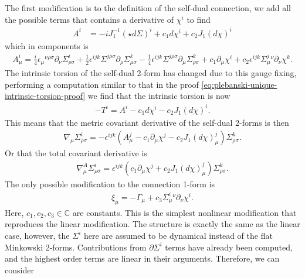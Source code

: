 \documentclass[10pt]{report}
\theoremstyle{definition}
\newcommand{\C}[0]{\mathbb{C}}
\begin{document}
        The first modification is to the definition of the self-dual connection, we add all the possible terms that contains a derivative of $\chi^i$ to find
        \begin{align}
            A^i &= -i J_1^{-1}(\star d \Sigma)^i + c_1 d\chi^i + c_2 J_1(d\chi)^i \label{eq:nonlinear-self-dual-connection-modified-definition}
        \end{align}
        which in components is 
        \begin{align}
            A^i_\mu = \frac{i}{4} \epsilon_\mu{}^{\nu\rho\sigma} \partial_\nu \Sigma^i_{\rho\sigma} + \frac{1}{2} \epsilon^{ijk} \Sigma^{j\rho\sigma} \partial_\rho \Sigma^k_{\mu\sigma} - \frac{1}{4} \epsilon^{ijk} \Sigma^{j\rho\sigma} \partial_\mu \Sigma^k_{\rho\sigma} + c_1 \partial_\mu \chi^i + c_2 \epsilon^{ijk} \Sigma^j_\mu{}^\nu \partial_\nu \chi^k.
        \end{align}
        The intrinsic torsion of the self-dual 2-form has changed due to this gauge fixing, performing a computation similar to that in the proof \cref{eq:plebanski-unique-intrinsic-torsion-proof} we find that the intrinsic torsion is now 
        \begin{align}
            -T^i = A^i - c_1 d\chi^i - c_2 J_1(d\chi)^i.
        \end{align}
        This means that the metric covariant derivative of the self-dual 2-forms is then 
        \begin{align}
            \nabla_\mu \Sigma^i_{\rho\sigma} = -\epsilon^{ijk} \left( A^j_\mu - c_1 \partial_\mu \chi^j - c_2 J_1(d\chi)^j_\mu \right) \Sigma^k_{\rho\sigma}.
        \end{align}
        Or that the total covariant derivative is 
        \begin{align}
            \nabla_\mu^A \Sigma^i_{\rho\sigma} = \epsilon^{ijk}(c_1 \partial_\mu \chi^j + c_2 J_1(d\chi)^j_\mu) \Sigma^k_{\rho\sigma} \label{eq:nonlinear-plebanski-modified-total-covariant-deriative-on-Sigma}.
        \end{align}
        The only possible modification to the connection 1-form is
        \begin{align}
            \xi_\mu = -\Gamma_\mu + c_3 \Sigma^i_\mu{}^\nu \partial_\nu \chi^i.
        \end{align}
        Here, $c_1,c_2,c_3 \in \C$ are constants. This is the simplest nonlinear modification that reproduces the linear modification. The structure is exactly the same as the linear case, however, the $\Sigma^i$ here are assumed to be dynamical instead of the flat Minkowski 2-forms. Contributions from $\partial \Sigma^i$ terms have already been computed, and the highest order terms are linear in their arguments. Therefore, we can consider
\end{document}
